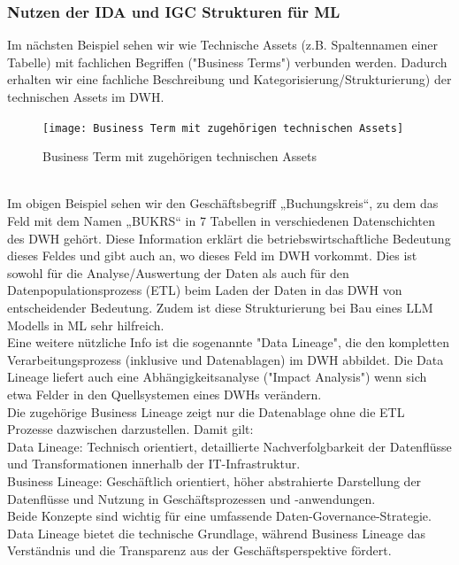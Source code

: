 \documentclass[12pt]{article}
\begin{document}
\subsubsection{Nutzen der IDA und IGC Strukturen für ML}
%
Im nächsten Beispiel sehen wir wie Technische Assets (z.B. Spaltennamen einer Tabelle) mit fachlichen Begriffen ("Business Terms") verbunden werden. Dadurch erhalten wir eine fachliche Beschreibung und Kategorisierung/Strukturierung) der technischen Assets im DWH.\\ 
%
\begin{figure}[htp]
  \centering
  \hspace*{-0.4cm} 
  \texttt{[image: Business Term mit zugehörigen technischen Assets]}
  \caption{Business Term mit zugehörigen technischen Assets}
  \label{fig:IGC-BT+TA}
\end{figure}
\\[0.2cm]
Im obigen Beispiel sehen wir den Geschäftsbegriff „Buchungskreis“, zu dem das Feld mit dem Namen „BUKRS“ in 7 Tabellen in verschiedenen Datenschichten des DWH gehört. 
Diese Information erklärt die betriebswirtschaftliche Bedeutung dieses Feldes und gibt auch an, wo dieses Feld im DWH vorkommt. Dies ist sowohl für die Analyse/Auswertung der Daten als auch für den Datenpopulationsprozess (ETL) beim Laden der Daten in das DWH von entscheidender Bedeutung. Zudem ist diese Strukturierung bei Bau eines LLM Modells in ML sehr hilfreich.\\
Eine weitere nützliche Info ist die sogenannte "Data Lineage", die den kompletten Verarbeitungsprozess (inklusive und Datenablagen) im DWH abbildet. Die Data Lineage liefert auch eine Abhängigkeitsanalyse ("Impact Analysis") wenn sich etwa Felder in den Quellsystemen eines DWHs verändern.\\
Die zugehörige Business Lineage zeigt nur die Datenablage ohne die ETL Prozesse dazwischen darzustellen. Damit gilt:\\
Data Lineage: Technisch orientiert, detaillierte Nachverfolgbarkeit der Datenflüsse und Transformationen innerhalb der IT-Infrastruktur.\\
Business Lineage: Geschäftlich orientiert, höher abstrahierte Darstellung der Datenflüsse und Nutzung in Geschäftsprozessen und -anwendungen.\\
Beide Konzepte sind wichtig für eine umfassende Daten-Governance-Strategie. Data Lineage bietet die technische Grundlage, während Business Lineage das Verständnis und die Transparenz aus der Geschäftsperspektive fördert. \\
\end{document}
